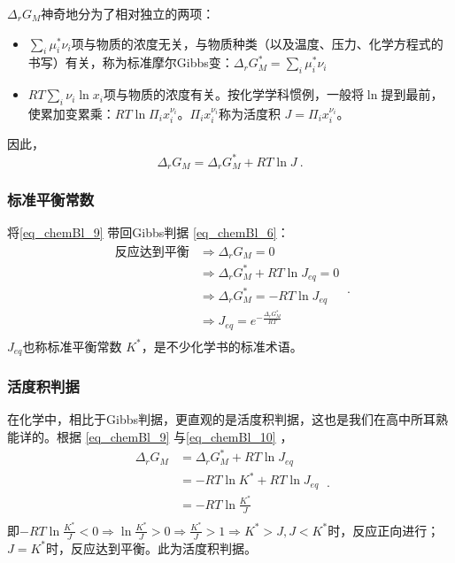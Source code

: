 $\Delta_r G_M$神奇地分为了相对独立的两项：
\begin{itemize}
\item $\sum_i \mu_i^* \nu_i$项与物质的浓度无关，与物质种类（以及温度、压力、化学方程式的书写）有关，称为标准摩尔Gibbs变：$\Delta_r G_M^* = \sum_i \mu_i^* \nu_i$
\item $RT \sum_i \nu_i \ln x_i$项与物质的浓度有关。按化学学科惯例，一般将$\ln$提到最前，使累加变累乘：$RT \ln \Pi_i x_i^{\nu_i}$。$\Pi_i x_i^{\nu_i}$称为活度积 $J=\Pi_i x_i^{\nu_i}$。
\end{itemize}
因此，\begin{equation} \label{eq_chemBl_9}
\Delta_r G_M = \Delta_r G_M^* + RT \ln J~.
\end{equation}

\subsubsection{标准平衡常数}
将\autoref{eq_chemBl_9} 带回Gibbs判据 \autoref{eq_chemBl_6}：
\begin{equation} \label{eq_chemBl_10}
\begin{aligned}
\text{反应达到平衡} &\Rightarrow \Delta_r G_M = 0\\
&\Rightarrow \Delta_r G_M^* + RT \ln J_{eq} = 0\\
&\Rightarrow \Delta_r G_M^* = - RT \ln J_{eq}\\
&\Rightarrow J_{eq} = e^{-\frac{\Delta_r G_M^*}{RT}}\\
\end{aligned}~.
\end{equation}
$J_{eq}$也称标准平衡常数 $K^*$，是不少化学书的标准术语。

\subsubsection{活度积判据}
在化学中，相比于Gibbs判据，更直观的是活度积判据，这也是我们在高中所耳熟能详的。根据 \autoref{eq_chemBl_9} 与\autoref{eq_chemBl_10} ，
$$
\begin{aligned}
\Delta_r G_M & = \Delta_r G_M^* + RT \ln J_{eq}\\
& = - RT \ln K^* + RT \ln J_{eq}\\
& = - RT \ln \frac{K^*}{J} \\
\end{aligned}~.
$$
即$- RT \ln \frac{K^*}{J}<0 \Rightarrow \ln \frac{K^*}{J} >0 \Rightarrow \frac{K^*}{J} >1 \Rightarrow K^*>J, J<K^*$时，反应正向进行；$J=K^*$时，反应达到平衡。此为活度积判据。

